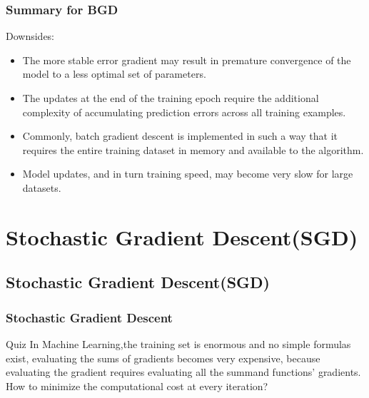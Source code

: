 \documentclass[cjk]{beamer}
\begin{document}
\begin{CJK*}{GBK}{kai}
\begin{frame}
\frametitle{Summary for BGD}
Downsides:
	\begin{itemize}
	\item The more stable error gradient may result in premature convergence of the model to a less optimal set of parameters.
	\item The updates at the end of the training epoch require the additional complexity of accumulating prediction errors across all training examples.
	\item Commonly, batch gradient descent is implemented in such a way that it requires the entire training dataset in memory and available to the algorithm.
	\item Model updates, and in turn training speed, may become very slow for large datasets.
	\end{itemize}
\end{frame}

\section{Stochastic Gradient Descent(SGD)}
\subsection{Stochastic Gradient Descent(SGD)}

\begin{frame}
\frametitle{Stochastic Gradient Descent}
	\begin{block}{Quiz}
	In Machine Learning,the training set is enormous and no simple formulas exist, evaluating the sums of 		gradients becomes very expensive, because evaluating the gradient requires evaluating all the summand functions' 	gradients.
	How to minimize the computational cost at every iteration? 
	\end{block}
\end{frame}


\end{CJK*}
\end{document}
